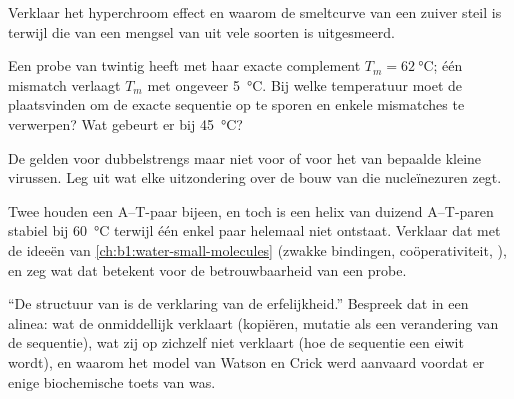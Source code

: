\begin{exercise}[$\star\star$]\label{exo:b1:nucleic-acids:8}
Verklaar het hyperchroom effect en waarom de smeltcurve van een zuiver  steil
is terwijl die van een mengsel van  uit vele soorten is uitgesmeerd.
\end{exercise}

\begin{exercise}[$\star\star$]\label{exo:b1:nucleic-acids:9}
Een probe van twintig  heeft met haar exacte complement
$T_m = \qty{62}{\celsius}$; één mismatch verlaagt $T_m$ met ongeveer
\qty{5}{\celsius}. Bij welke temperatuur moet de  plaatsvinden om de
exacte sequentie op te sporen en enkele mismatches te verwerpen? Wat gebeurt er
bij \qty{45}{\celsius}?
\end{exercise}

\begin{exercise}[$\star\star\star$]\label{exo:b1:nucleic-acids:10}
De  gelden voor dubbelstrengs  maar niet voor  of voor
het  van bepaalde kleine virussen. Leg uit wat elke uitzondering over de bouw
van die nucleïnezuren zegt.
\end{exercise}

\begin{exercise}[$\star\star\star$]\label{exo:b1:nucleic-acids:11}
Twee  houden een A--T-paar bijeen, en toch is een helix van
duizend A--T-paren stabiel bij \qty{60}{\celsius} terwijl één enkel paar helemaal
niet ontstaat. Verklaar dat met de ideeën van
\cref{ch:b1:water-small-molecules} (zwakke bindingen, coöperativiteit, ),
en zeg wat dat betekent voor de betrouwbaarheid van een probe.
\end{exercise}

\begin{exercise}[$\star\star\star$]\label{exo:b1:nucleic-acids:12}
``De structuur van  is de verklaring van de erfelijkheid.'' Bespreek dat in een
alinea: wat de  onmiddellijk verklaart (kopiëren, mutatie als een
verandering van de sequentie), wat zij op zichzelf niet verklaart (hoe de
sequentie een eiwit wordt), en waarom het model van Watson en Crick werd aanvaard
voordat er enige biochemische toets van was.
\end{exercise}

